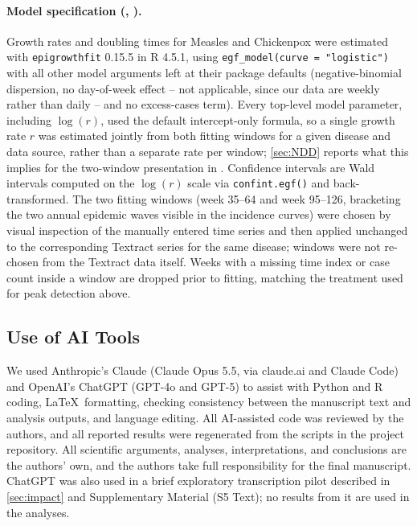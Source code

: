 \documentclass[12pt]{article}
\begin{document}
\paragraph{Model specification (, ).} Growth rates and doubling times for Measles and Chickenpox were estimated with \texttt{epigrowthfit} 0.15.5 \cite{JaganRpkg} in R 4.5.1, using \texttt{egf\_model(curve = "logistic")} with all other model arguments left at their package defaults (negative-binomial dispersion, no day-of-week effect -- not applicable, since our data are weekly rather than daily -- and no excess-cases term). Every top-level model parameter, including $\log(r)$, used the default intercept-only formula, so a single growth rate $r$ was estimated jointly from both fitting windows for a given disease and data source, rather than a separate rate per window; \cref{sec:NDD} reports what this implies for the two-window presentation in . Confidence intervals are Wald intervals computed on the $\log(r)$ scale via \texttt{confint.egf()} and back-transformed. The two fitting windows (week 35--64 and week 95--126, bracketing the two annual epidemic waves visible in the incidence curves) were chosen by visual inspection of the manually entered time series and then applied unchanged to the corresponding Textract series for the same disease; windows were not re-chosen from the Textract data itself. Weeks with a missing time index or case count inside a window are dropped prior to fitting, matching the treatment used for peak detection above.

\subsection{Use of AI Tools}\label{sec:ai-disclosure}
We used Anthropic's Claude (Claude Opus 5.5, via claude.ai and Claude Code) and OpenAI's ChatGPT (GPT-4o and GPT-5) to assist with Python and R coding, \LaTeX\ formatting, checking consistency between the manuscript text and analysis outputs, and language editing. All AI-assisted code was reviewed by the authors, and all reported results were regenerated from the scripts in the project repository. All scientific arguments, analyses, interpretations, and conclusions are the authors' own, and the authors take full responsibility for the final manuscript. ChatGPT was also used in a brief exploratory transcription pilot described in \cref{sec:impact} and Supplementary Material (S5 Text); no results from it are used in the analyses.
\end{document}
